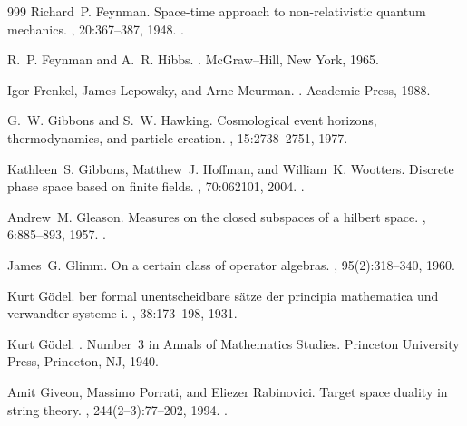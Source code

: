 \begin{thebibliography}{999}
Richard~P. Feynman.
\newblock Space-time approach to non-relativistic quantum mechanics.
, 20:367--387, 1948.
\newblock \href {https://doi.org/10.1103/RevModPhys.20.367}
  {}.

R.~P. Feynman and A.~R. Hibbs.
.
\newblock McGraw--Hill, New York, 1965.

Igor Frenkel, James Lepowsky, and Arne Meurman.
.
\newblock Academic Press, 1988.

G.~W. Gibbons and S.~W. Hawking.
\newblock Cosmological event horizons, thermodynamics, and particle creation.
, 15:2738--2751, 1977.

Kathleen~S. Gibbons, Matthew~J. Hoffman, and William~K. Wootters.
\newblock Discrete phase space based on finite fields.
, 70:062101, 2004.
\newblock \href {https://doi.org/10.1103/PhysRevA.70.062101}
  {}.

Andrew~M. Gleason.
\newblock Measures on the closed subspaces of a hilbert space.
, 6:885--893, 1957.
\newblock \href {https://doi.org/10.1512/iumj.1957.6.56050}
  {}.

James~G. Glimm.
\newblock On a certain class of operator algebras.
,
  95(2):318--340, 1960.

Kurt G{\"o}del.
ber formal unentscheidbare s{\"a}tze der principia mathematica
  und verwandter systeme i.
, 38:173--198, 1931.

Kurt G{\"o}del.
.
\newblock Number~3 in Annals of Mathematics Studies. Princeton University
  Press, Princeton, NJ, 1940.

Amit Giveon, Massimo Porrati, and Eliezer Rabinovici.
\newblock Target space duality in string theory.
, 244(2--3):77--202, 1994.
\newblock \href {https://doi.org/10.1016/0370-1573(94)90070-1}
  {}.


\end{thebibliography}
